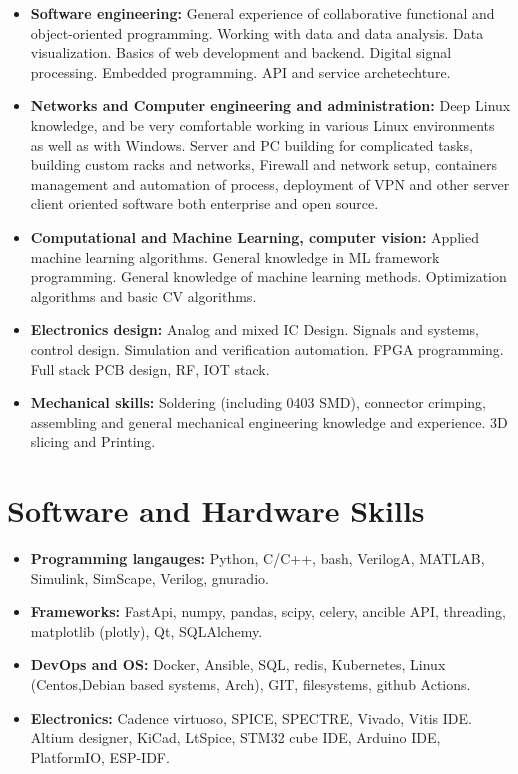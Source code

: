 \documentclass{article}
\begin{document}
\begin{itemize}

   \item \textbf{Software engineering:} General experience of collaborative functional and object-oriented programming. Working with data and data analysis. Data visualization. Basics of web development and backend. Digital signal processing. Embedded programming. API and service archetechture.
   \item \textbf{Networks and Computer engineering and administration:} Deep Linux knowledge, and be very comfortable working in various Linux environments as well as with Windows. Server and PC building for complicated tasks, building custom racks and networks, Firewall and network setup, containers management and automation of process, deployment of VPN and other server client oriented software both enterprise and open source.
   \item \textbf{Computational and Machine Learning, computer vision:} Applied machine learning algorithms. General knowledge in ML framework programming. General knowledge of machine learning methods. Optimization algorithms and basic CV algorithms.
   \item \textbf{Electronics design:} Analog and mixed IC Design. Signals and systems, control design. Simulation and verification automation. FPGA programming. Full stack PCB design, RF, IOT stack.
   \item \textbf{Mechanical skills:} Soldering (including 0403 SMD), connector crimping,  assembling and general mechanical engineering knowledge and experience. 3D slicing and Printing.
\end{itemize}

\section{Software and Hardware Skills}

\begin{itemize}

   \item \textbf{Programming langauges:} Python, C/C++, bash, VerilogA, MATLAB, Simulink, SimScape, Verilog, gnuradio.
   \item \textbf{Frameworks:} FastApi, numpy, pandas, scipy, celery, ancible API, threading, matplotlib (plotly), Qt, SQLAlchemy.
   \item \textbf{DevOps and OS:} Docker, Ansible, SQL, redis, Kubernetes, Linux (Centos,Debian based systems, Arch), GIT, filesystems, github Actions.
   \item \textbf{Electronics:} Cadence virtuoso, SPICE, SPECTRE, Vivado, Vitis IDE. Altium designer, KiCad, LtSpice, STM32 cube IDE, Arduino IDE, PlatformIO, ESP-IDF.

\end{itemize}
\end{document}
